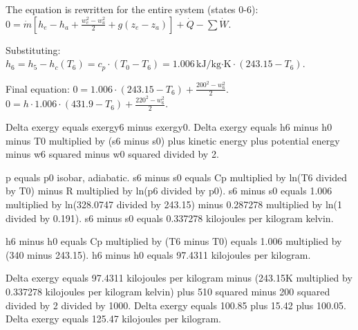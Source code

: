 The equation is rewritten for the entire system (states 0-6):  
\( 0 = \dot{m} \left[ h_e - h_a + \frac{w_e^2 - w_a^2}{2} + g(z_e - z_a) \right] + \dot{Q} - \sum \dot{W} \).  

Substituting:  
\( h_6 = h_5 - h_c(T_6) = c_p \cdot (T_0 - T_6) = 1.006 \, \text{kJ/kg·K} \cdot (243.15 - T_6) \).  

Final equation:  
\( 0 = 1.006 \cdot (243.15 - T_6) + \frac{200^2 - w_6^2}{2} \).  
\( 0 = h \cdot 1.006 \cdot (431.9 - T_6) + \frac{220^2 - w_6^2}{2} \).

Delta exergy equals exergy6 minus exergy0.  
Delta exergy equals h6 minus h0 minus T0 multiplied by (s6 minus s0) plus kinetic energy plus potential energy minus w6 squared minus w0 squared divided by 2.  

p equals p0 isobar, adiabatic.  
s6 minus s0 equals Cp multiplied by ln(T6 divided by T0) minus R multiplied by ln(p6 divided by p0).  
s6 minus s0 equals 1.006 multiplied by ln(328.0747 divided by 243.15) minus 0.287278 multiplied by ln(1 divided by 0.191).  
s6 minus s0 equals 0.337278 kilojoules per kilogram kelvin.  

h6 minus h0 equals Cp multiplied by (T6 minus T0) equals 1.006 multiplied by (340 minus 243.15).  
h6 minus h0 equals 97.4311 kilojoules per kilogram.  

Delta exergy equals 97.4311 kilojoules per kilogram minus (243.15K multiplied by 0.337278 kilojoules per kilogram kelvin) plus 510 squared minus 200 squared divided by 2 divided by 1000.  
Delta exergy equals 100.85 plus 15.42 plus 100.05.  
Delta exergy equals 125.47 kilojoules per kilogram.